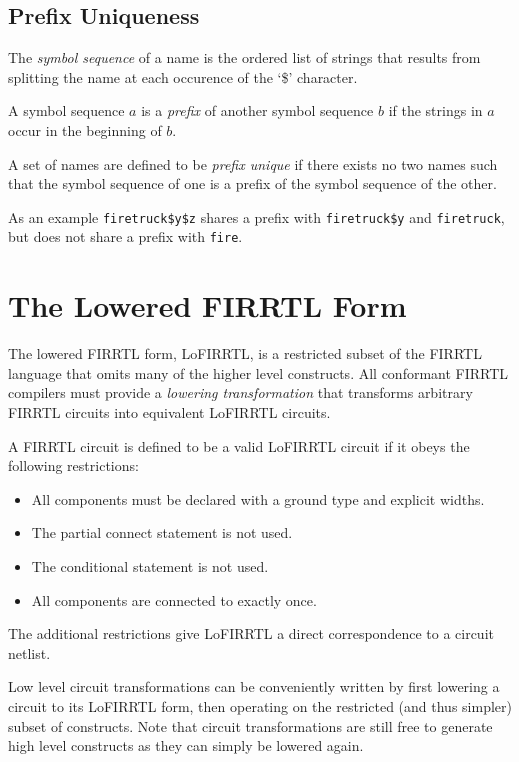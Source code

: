 \documentclass[12pt]{article}
\begin{document}
\subsection{Prefix Uniqueness} \label{prefix_unique}

The {\em symbol sequence} of a name is the ordered list of strings that results from splitting the name at each occurence of the `\$' character.

A symbol sequence $a$ is a {\em prefix} of another symbol sequence $b$ if the strings in $a$ occur in the beginning of $b$.

A set of names are defined to be {\em prefix unique} if there exists no two names such that the symbol sequence of one is a prefix of the symbol sequence of the other.

As an example \verb|firetruck$y$z| shares a prefix with \verb|firetruck$y| and \verb|firetruck|, but does not share a prefix with \verb|fire|.

\section{The Lowered FIRRTL Form}

The lowered FIRRTL form, LoFIRRTL, is a restricted subset of the FIRRTL language that omits many of the higher level constructs. All conformant FIRRTL compilers must provide a {\em lowering transformation} that transforms arbitrary FIRRTL circuits into equivalent LoFIRRTL circuits.

A FIRRTL circuit is defined to be a valid LoFIRRTL circuit if it obeys the following restrictions:
\begin{itemize}
\item All components must be declared with a ground type and explicit widths.
\item The partial connect statement is not used.
\item The conditional statement is not used.
\item All components are connected to exactly once.
\end{itemize}

The additional restrictions give LoFIRRTL a direct correspondence to a circuit netlist.

Low level circuit transformations can be conveniently written by first lowering a circuit to its LoFIRRTL form, then operating on the restricted (and thus simpler) subset of constructs. Note that circuit transformations are still free to generate high level constructs as they can simply be lowered again.
\end{document}
